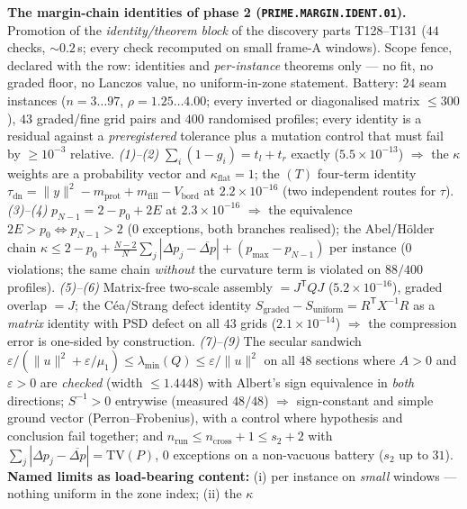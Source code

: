 \documentclass[11pt,a4paper]{article}
\begin{document}
\par\smallskip\noindent\textbf{The margin-chain identities of phase 2
(\texttt{PRIME.MARGIN.IDENT.01}).}
Promotion of the \emph{identity/theorem block} of the discovery parts
T128--T131 ($44$ checks, ${\sim}0.2$\,s; every check recomputed on small
frame-A windows). Scope fence, declared with the row: identities and
\emph{per-instance} theorems only --- no fit, no graded floor, no Lanczos
value, no uniform-in-zone statement. Battery: $24$ seam instances
($n=3\ldots97$, $\rho=1.25\ldots4.00$; every inverted or diagonalised matrix
$\le300$), $43$ graded/fine grid pairs and $400$ randomised profiles; every
identity is a residual against a \emph{preregistered} tolerance plus a mutation
control that must fail by $\ge10^{-3}$ relative.
\emph{(1)--(2)} $\sum_i(1-g_i)=t_l+t_r$ exactly ($5.5\times10^{-13}$)
$\Rightarrow$ the $\kappa$ weights are a probability vector and
$\kappa_{\mathrm{flat}}=1$; the $(T)$ four-term identity
$\tau_{\mathrm{dn}}=\|y\|^2-m_{\mathrm{prot}}+m_{\mathrm{fill}}-V_{\mathrm{bord}}$
at $2.2\times10^{-16}$ (two independent routes for $\tau$).
\emph{(3)--(4)} $p_{N-1}=2-p_0+2E$ at $2.3\times10^{-16}$ $\Rightarrow$ the
equivalence $2E>p_0\iff p_{N-1}>2$ ($0$ exceptions, both branches realised);
the Abel/H\"older chain
$\kappa\le2-p_0+\frac{N-2}{N}\sum_j|\Delta p_j-\overline{\Delta p}|+(p_{\max}-p_{N-1})$
per instance ($0$ violations; the same chain \emph{without} the curvature term
is violated on $88/400$ profiles).
\emph{(5)--(6)} Matrix-free two-scale assembly $=J^{\mathsf T}QJ$
($5.2\times10^{-16}$), graded overlap $=J$; the C\'ea/Strang defect identity
$S_{\mathrm{graded}}-S_{\mathrm{uniform}}=R^{\mathsf T}X^{-1}R$ as a
\emph{matrix} identity with PSD defect on all $43$ grids
($2.1\times10^{-14}$) $\Rightarrow$ the compression error is one-sided by
construction.
\emph{(7)--(9)} The secular sandwich
$\varepsilon/(\|u\|^2+\varepsilon/\mu_1)\le\lambda_{\min}(Q)\le\varepsilon/\|u\|^2$
on all $48$ sections where $A>0$ and $\varepsilon>0$ are \emph{checked} (width
$\le1.4448$) with Albert's sign equivalence in \emph{both} directions;
$S^{-1}>0$ entrywise (measured $48/48$) $\Rightarrow$ sign-constant and simple
ground vector (Perron--Frobenius), with a control where hypothesis and
conclusion fail together; and
$n_{\mathrm{run}}\le n_{\mathrm{cross}}+1\le s_2+2$ with
$\sum_j|\Delta p_j-\overline{\Delta p}|=\mathrm{TV}(P)$, $0$ exceptions on a
non-vacuous battery ($s_2$ up to $31$).
\textbf{Named limits as load-bearing content:} (i) per instance on
\emph{small} windows --- nothing uniform in the zone index; (ii) the $\kappa$
\end{document}
